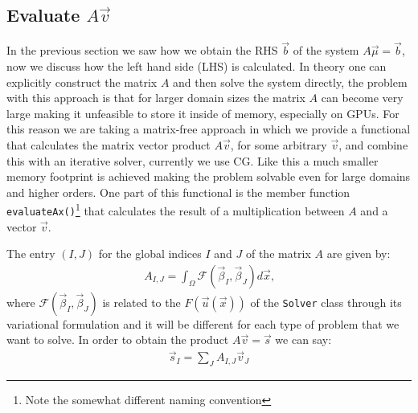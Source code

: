 \subsection{Evaluate \(A\vec{v}\)}
\label{subsubsec:evaluateAx}
In the previous section we saw how we obtain the RHS $\vec{b}$ of the system $A\vec{\mu} = \vec{b}$, now we discuss how the left hand side (LHS) is calculated. In theory one can explicitly construct the matrix $A$ and then solve the system directly, the problem with this approach is that for larger domain sizes the matrix $A$ can become very large making it unfeasible to store it inside of memory, especially on GPUs. For this reason we are taking a matrix-free approach in which we provide a functional that calculates the matrix vector product $A\vec{v}$, for some arbitrary $\vec{v}$, and combine this with an iterative solver, currently we use CG. Like this a much smaller memory footprint is achieved making the problem solvable even for large domains and higher orders. One part of this functional is the member function \texttt{evaluateAx()}\footnote{Note the somewhat different naming convention} that calculates the result of a multiplication between \(A\) and a vector \(\vec v\). \medskip

The entry $(I,J)$ for the global indices $I$ and $J$ of the matrix $A$ are given by:
\begin{align}
    A_{I,J} = \int_\Omega \mathcal{F}(\vec\beta_I, \vec\beta_J) d\vec{x}\text{,} \label{eq:varlhs}
\end{align}
where $\mathcal{F}(\vec\beta_I, \vec\beta_J)$ is related to the $F(\vec{u}(\vec{x}))$ of the \texttt{Solver} class through its variational formulation and it will be different for each type of problem that we want to solve. In order to obtain the product $A\vec{v} = \vec{s}$ we can say:
\begin{align}
\vec{s}_I = \sum_J A_{I,J} \vec{v}_J \label{eq:AxEval}
\end{align}
\medskip

